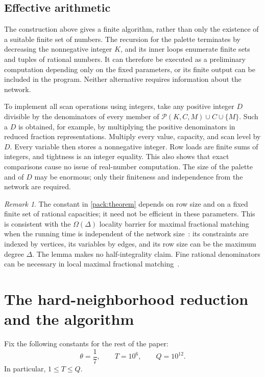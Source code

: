 \documentclass[11pt,a4paper]{article}
\theoremstyle{definition}
\theoremstyle{remark}
\newtheorem{remark}[remark]{Remark}
\begin{document}
\subsection{Effective arithmetic}

The construction above gives a finite algorithm, rather than only the
existence of a suitable finite set of numbers.  The recursion for the
palette terminates by decreasing the nonnegative integer $K$, and its
inner loops enumerate finite sets and tuples of rational numbers.  It
can therefore be executed as a preliminary computation depending only
on the fixed parameters, or its finite output can be included in the
program.  Neither alternative requires information about the network.

To implement all scan operations using integers, take any positive
integer $D$ divisible by the denominators of every member of
$\mathcal P(K,C,M)\cup C\cup\{M\}$.  Such a $D$ is obtained, for
example, by multiplying the positive denominators in reduced fraction
representations.  Multiply every value, capacity, and scan level by
$D$.  Every variable then stores a nonnegative integer.  Row loads are
finite sums of integers, and tightness is an integer equality.  This
also shows that exact comparisons cause no issue of real-number
computation.  The size of the palette and of $D$ may be enormous; only
their finiteness and independence from the network are required.

\begin{remark}
The constant in \cref{pack:theorem} depends on row size and on a fixed
finite set of rational capacities; it need not be efficient in these
parameters. This is consistent with the \(\Omega(\Delta)\) locality
barrier for maximal fractional matching when the running time is
independent of the network size~\cite{GHS17}: its constraints
are indexed by vertices, its variables by edges, and its row size can
be the maximum degree \(\Delta\). The lemma makes no half-integrality
claim. Fine rational denominators can be necessary in local maximal
fractional matching~\cite{Dahal24}.
\end{remark}


\section{The hard-neighborhood reduction and the algorithm}
\label{sec:algorithm}

Fix the following constants for the rest of the paper:
\begin{equation}\label{eq:constants}
  \theta=\frac17,\qquad T=10^6,\qquad Q=10^{12}.
\end{equation}
In particular, \(1\leq T\leq Q\).
\end{document}
